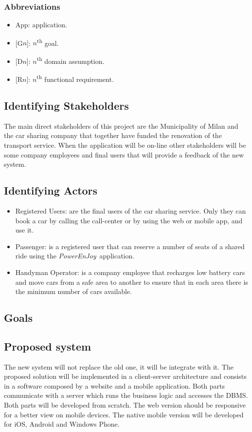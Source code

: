 \documentclass{article}
\newcommand{\pej}{\mbox{\normalfont\itshape PowerEnJoy }}
\begin{document}
		\subsubsection{Abbreviations}
			\begin{itemize}
				\item App: application.
				\item {[}G$n${]}: $n$\textsuperscript{th} goal.
				\item {[}D$n${]}: $n$\textsuperscript{th} domain assumption.
				\item {[}R$n${]}: $n$\textsuperscript{th} functional requirement.
			\end{itemize}
		\subsection{Identifying Stakeholders}
		The main direct stakeholders of this project are the Municipality of Milan and the car sharing company that together have funded the renovation of the transport service. When the application will be on-line other stakeholders will be some company employees and final users that will provide a feedback of the new system.
		\subsection{Identifying Actors}
			\begin{itemize}
				\item Registered Users: are the final users of the car sharing service. Only they can book a car by calling the call-center or by using the web or mobile app, and use it.
				\item Passenger: is a registered user that can reserve a number of seats of a shared ride using the \pej application.
				\item Handyman Operator: is a company employee that recharges low battery cars and move cars from a safe area to another to ensure that in each area there is the minimum number of cars available.
			\end{itemize}
		\subsection{Goals} \label{sec:goals}
		
		
		\subsection{Proposed system}
		The new system will not replace the old one, it will be integrate with it. The proposed solution will be implemented in a client-server architecture and consists in a software composed by a website and a mobile application. Both parts communicate with a server which runs the business logic and accesses the DBMS. Both parts will be developed from scratch. The web version should be responsive for a better view on mobile devices. The native mobile version will be developed for iOS, Android and Windows Phone.
			
\end{document}
